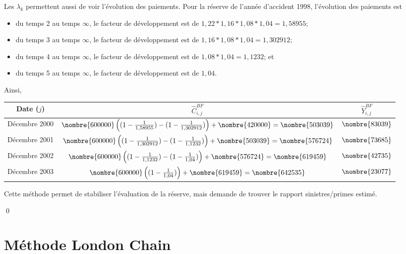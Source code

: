 \begin{exemple}
\begin{enumerate}
    Les $\lambda_k$ permettent aussi de voir l'évolution des
    paiements. Pour la réserve de l'année d'accident 1998, l'évolution
    des paiements est
    \begin{itemize}
    \item du temps 2 au temps $\infty$, le facteur de développement
      est de $1,22 * 1,16 * 1,08 * 1,04 = 1,58955$;
    \item du temps 3 au temps $\infty$, le facteur de développement
      est de $1,16 * 1,08 * 1,04 = 1,302912$;
    \item du temps 4 au temps $\infty$, le facteur de développement
      est de $1,08 * 1,04 = 1,1232$; et
    \item du temps 5 au temps $\infty$, le facteur de développement
      est de $1,04$.
    \end{itemize}
    Ainsi,
    \begin{center}
      \begin{tabular}{|c|c|c|}\hline
        Date ($j$) & $\hat{C}_{i,j}^{BF}$ & $\hat{Y}_{i,j}^{BF}$  \\ \hline
        Décembre 2000 &  $\nombre{600000} \left((1-\frac{1}{1,58955}) - (1-\frac{1}{1,302912})\right)   + \nombre{420000} = \nombre{503039}$ & $\nombre{83039}$ \\ \hline
        Décembre 2001 &  $\nombre{600000} \left((1-\frac{1}{1,302912}) - (1-\frac{1}{1,1232})\right) + \nombre{503039} = \nombre{576724}$ & $\nombre{73685}$\\ \hline
        Décembre 2002 &  $\nombre{600000} \left((1-\frac{1}{1,1232}) - (1-\frac{1}{1,04})\right) + \nombre{576724} = \nombre{619459}$ & $\nombre{42735}$\\ \hline
        Décembre 2003 &  $\nombre{600000} \left((1-\frac{1}{1,04}) \right)  + \nombre{619459} = \nombre{642535}$ & $\nombre{23077}$\\ \hline
      \end{tabular}
    \end{center}
    Cette méthode permet de stabiliser l'évaluation de la réserve,
    mais demande de trouver le rapport sinistres/primes estimé.
  \end{enumerate}
  \qed
\end{exemple}


\section{Méthode London Chain}

